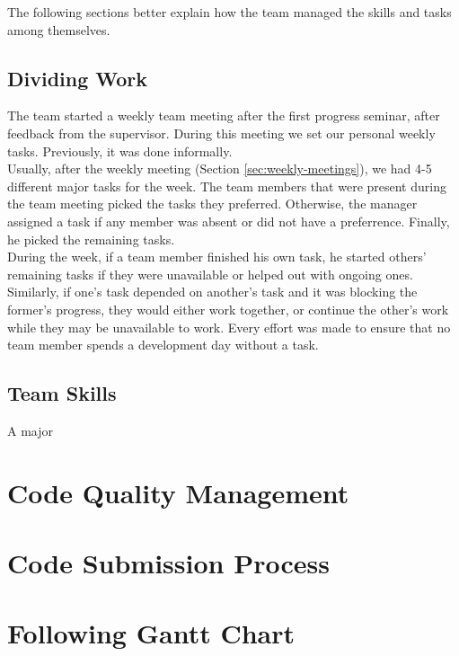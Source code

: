The following sections better explain how the team managed the skills and tasks among themselves.

\subsection{Dividing Work}
\label{subsec:dividing-work}
The team started a weekly team meeting after the first progress seminar, after feedback from the supervisor. During this meeting we set our personal weekly tasks. Previously, it was done informally.\\

Usually, after the weekly meeting (Section \ref{sec:weekly-meetings}), we had 4-5 different major tasks for the week. The team members that were present during the team meeting picked the tasks they preferred. Otherwise, the manager assigned a task if any member was absent or did not have a preferrence. Finally, he picked the remaining tasks.\\

During the week, if a team member finished his own task, he started others' remaining tasks if they were unavailable or helped out with ongoing ones. Similarly, if one's task depended on another's task and it was blocking the former's progress, they would either work together, or continue the other's work while they may be unavailable to work. Every effort was made to ensure that no team member spends a development day without a task.

\subsection{Team Skills}
\label{subsec:team-skills}
A major



\section{Code Quality Management}
\label{sec:code-quality-management}


\section{Code Submission Process}
\label{sec:code-submission-process}


\section{Following Gantt Chart}
\label{sec:following-gantt-chart}
